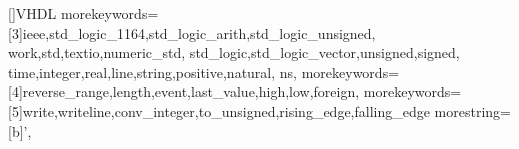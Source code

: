 []{VHDL}%
{%
morekeywords=[3]{ieee,std_logic_1164,std_logic_arith,std_logic_unsigned,%
	work,std,textio,numeric_std,%
	std_logic,std_logic_vector,unsigned,signed,%
	time,integer,real,line,string,positive,natural,%
	ns},%
morekeywords=[4]{reverse_range,length,event,last_value,high,low,foreign},%
morekeywords=[5]{write,writeline,conv_integer,to_unsigned,rising_edge,falling_edge}%
morestring=[b]',
}
